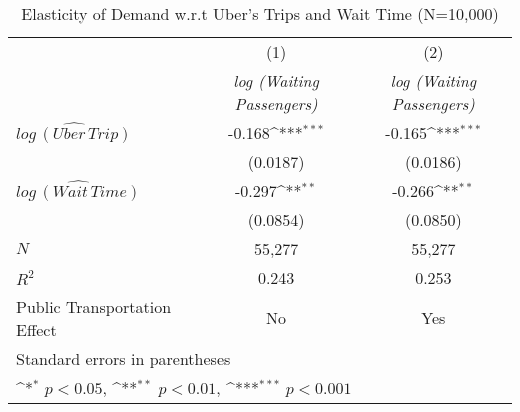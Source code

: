 \begin{table}[h]
\caption{Elasticity of Demand w.r.t Uber's Trips and Wait Time (N=10,000)}\label{tab:robust_uber_10000}\\

{
\def\sym#1{\ifmmode^{#1}\else\(^{#1}\)\fi}
\begin{center}
\begin{tabular}{l*{2}{c}}
\hline\hline
            &\multicolumn{1}{c}{(1)}&\multicolumn{1}{c}{(2)}\\
             &\multicolumn{1}{c}{\textit{log (Waiting Passengers)}}&\multicolumn{1}{c}{\textit{log (Waiting Passengers)}}\\
\hline
${\widehat{log\, (Uber\,Trip)}}$  &      -0.168\sym{***}&      -0.165\sym{***}\\
            &    (0.0187)         &    (0.0186)         \\
[1em]
${\widehat{log\, (Wait\, Time)}}$&      -0.297\sym{**}&      -0.266\sym{**} \\
            &    (0.0854)         &    (0.0850)         \\
\hline
\(N\)       &       55,277         &       55,277         \\
\(R^{2}\)   &       0.243         &       0.253         \\
Public Transportation Effect &         No            &             Yes        \\
\hline\hline
\multicolumn{3}{l}{\footnotesize Standard errors in parentheses}\\
\multicolumn{3}{l}{\footnotesize \sym{*} \(p<0.05\), \sym{**} \(p<0.01\), \sym{***} \(p<0.001\)}\\
\end{tabular}
\end{center}
}


\end{table}
